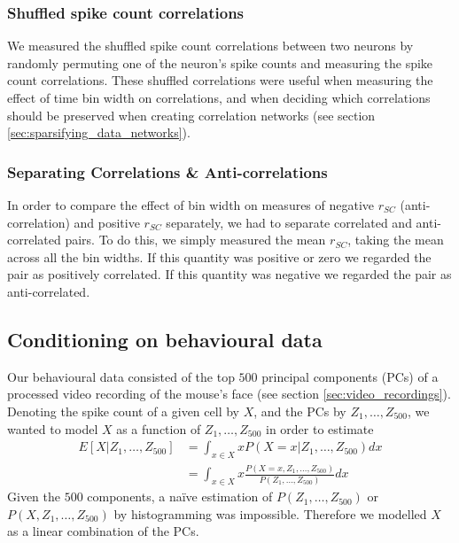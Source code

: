 \documentclass[a4paper,12pt]{article}
\theoremstyle{definition}
\begin{document}
        \subsubsection{Shuffled spike count correlations}\label{sec:shuffled_correlations}
        We measured the shuffled spike count correlations between two neurons by randomly permuting one of the neuron's spike counts and measuring the spike count correlations. These shuffled correlations were useful when measuring the effect of time bin width on correlations, and when deciding which correlations should be preserved when creating correlation networks (see section \ref{sec:sparsifying_data_networks}).

        \subsubsection{Separating Correlations \& Anti-correlations}\label{sec:corr_anti_corr}
        In order to compare the effect of bin width on measures of negative $r_{SC}$ (anti-correlation) and positive $r_{SC}$ separately, we had to separate correlated and anti-correlated pairs. To do this, we simply measured the mean $r_{SC}$, taking the mean across all the bin widths. If this quantity was positive or zero we regarded the pair as positively correlated. If this quantity was negative we regarded the pair as anti-correlated.

    \subsection{Conditioning on behavioural data}
    Our behavioural data consisted of the top $500$ principal components (PCs) of a processed video recording of the mouse's face (see section \ref{sec:video_recordings}). Denoting the spike count of a given cell by $X$, and the PCs by $Z_1,\dots,Z_{500}$, we wanted to model $X$ as a function of $Z_1,\dots,Z_{500}$ in order to estimate
    \begin{align}
      E[X|Z_1,\dots,Z_{500}] &= \int_{x \in X} x P(X=x | Z_1,\dots,Z_{500}) dx \\
        &= \int_{x \in X} x \frac{P(X=x, Z_1,\dots,Z_{500})}{P(Z_1,\dots,Z_{500})} dx
    \end{align}
    Given the $500$ components, a na\"{i}ve estimation of $P(Z_1,\dots,Z_{500})$ or $P(X, Z_1,\dots,Z_{500})$ by histogramming was impossible. Therefore we modelled $X$ as a linear combination of the PCs.
\end{document}
